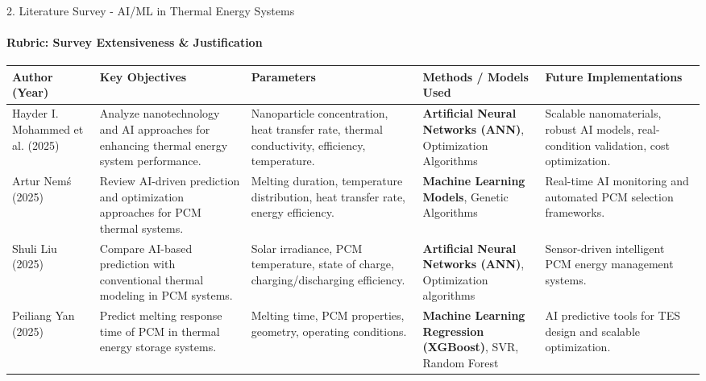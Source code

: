 \documentclass[aspectratio=169, 11pt]{beamer}
\begin{document}
\begin{frame}{2. Literature Survey - AI/ML in Thermal Energy Systems}
\framesubtitle{Rubric: Survey Extensiveness \& Justification}
\tiny
\renewcommand{\arraystretch}{1.5}
\begin{table}
\centering
\begin{tabular}{|p{1.6cm}|p{3.0cm}|p{2.8cm}|p{3.0cm}|p{3.0cm}|}
\hline
\textbf{Author (Year)} &
\textbf{Key Objectives} &
\textbf{Parameters} &
\textbf{Methods / Models Used} &
\textbf{Future Implementations} \\
\hline
Hayder I. Mohammed et al. (2025) \cite{Mohammed2025AIthermal} &
Analyze nanotechnology and AI approaches for enhancing thermal energy system performance. &
Nanoparticle concentration, heat transfer rate, thermal conductivity, efficiency, temperature. &
\textbf{Artificial Neural Networks (ANN)}, Optimization Algorithms &
Scalable nanomaterials, robust AI models, real-condition validation, cost optimization. \\
\hline

Artur Nem\'s (2025) \cite{Nems2025AIPCMReview} &
Review AI-driven prediction and optimization approaches for PCM thermal systems. &
Melting duration, temperature distribution, heat transfer rate, energy efficiency. &
\textbf{Machine Learning Models}, Genetic Algorithms &
Real-time AI monitoring and automated PCM selection frameworks. \\
\hline

Shuli Liu (2025) \cite{Liu2025AIPCM} &
Compare AI-based prediction with conventional thermal modeling in PCM systems. &
Solar irradiance, PCM temperature, state of charge, charging/discharging efficiency. &
\textbf{Artificial Neural Networks (ANN)}, Optimization algorithms &
Sensor-driven intelligent PCM energy management systems. \\
\hline


Peiliang Yan (2025) \cite{Yan2025ML_PCM_Melting} &
Predict melting response time of PCM in thermal energy storage systems. &
Melting time, PCM properties, geometry, operating conditions. &
\textbf{Machine Learning Regression (XGBoost)}, SVR, Random Forest &
AI predictive tools for TES design and scalable optimization. \\
\hline
\end{tabular}
\end{table}
\end{frame}
\end{document}

